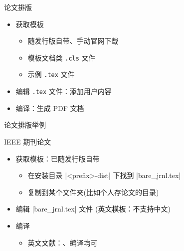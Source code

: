 \begin{frame}{论文排版}
    \begin{itemize}
      \item 获取模板
        \begin{itemize}
          \item 随发行版自带、手动官网下载
          \item 模板文档类 \texttt{.cls} 文件
          \item 示例 \texttt{.tex} 文件
        \end{itemize}
      \item 编辑 \texttt{.tex} 文件：添加用户内容
      \item 编译：生成 PDF 文档
    \end{itemize}
  \end{frame}
  
  \begin{frame}[fragile]{论文排版举例}
    \begin{exampleblock}{IEEE 期刊论文}
      \begin{itemize}
        \item 获取模板：已随发行版自带
          \begin{itemize}
            \item 在安装目录 |<prefix>\texlive{}\texmf-dist\doc\latex\IEEEtran|
              下找到 |bare_jrnl.tex|
            \item 复制到某个文件夹(比如个人存论文的目录)
          \end{itemize}
        \item 编辑 |bare_jrnl.tex| 文件 (英文模板：不支持中文)
        \item 编译
          \begin{itemize}
            \item 英文文献：\XeLaTeX 、\pdfLaTeX 编译均可
          \end{itemize}
      \end{itemize}
    \end{exampleblock}
  \end{frame}



